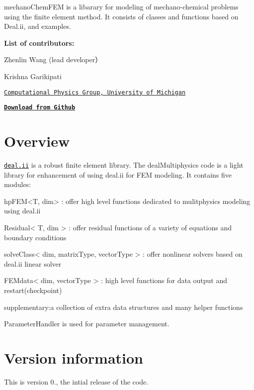 mechano\+Chem\+F\+EM is a libarary for modeling of mechano-\/chemical problems using the finite element method. It consists of classes and functions based on Deal.\+ii, and examples.

{\bfseries List of contributors\+:}~\newline


Zhenlin Wang (lead developer）~\newline


Krishna Garikipati~\newline


\href{http://umich.edu/~compphys/index.html}{\tt Computational Physics Group, University of Michigan}

\href{https://github.com/mechanoChem/mechanoChemFEM}{\tt {\bfseries Download from Github}}

\section*{{\bfseries Overview}~\newline
 }

\href{http://www.dealii.org}{\tt deal.\+ii} is a robust finite element library. The deal\+Multiphysics code is a light library for enhancement of using deal.\+ii for F\+EM modeling. It contains five modules\+:

\begin{DoxyVerb}hpFEM<T, dim> : offer high level functions dedicated to mulitphysics modeling using deal.ii

Residual< T, dim > : offer residual functions of a variety of equations and boundary conditions

solveClass< dim, matrixType, vectorType > : offer nonlinear solvers based on deal.ii linear solver

FEMdata< dim, vectorType > : high level functions for data output and restart(checkpoint)

supplementary:a collection of extra data structures and many helper functions
\end{DoxyVerb}


Parameter\+Handler is used for parameter management.

\section*{{\bfseries Version information}~\newline
 }

This is version 0., the intial release of the code.

